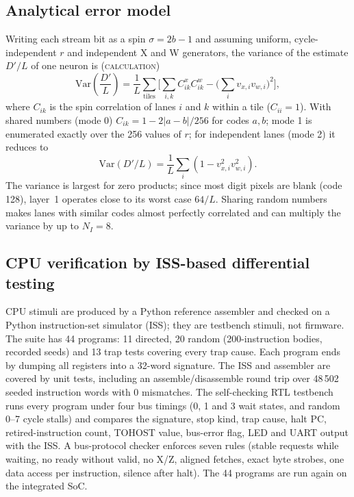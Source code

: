 \documentclass[conference]{IEEEtran}
\newcommand{\Dp}{D'}                 %
\newcommand{\IL}{N_{I}}              %
\newcommand{\lbl}[1]{\textsc{#1}}    %
\begin{document}
\subsection{Analytical error model}
Writing each stream bit as a spin $\sigma=2b-1$ and assuming uniform,
cycle-independent $r$ and independent X and W generators, the variance of the
estimate $\Dp/L$ of one neuron is (\lbl{calculation})
\begin{equation}
  \mathrm{Var}\!\left(\frac{\Dp}{L}\right) = \frac{1}{L}\sum_{\text{tiles}}
  \Big[\sum_{i,k} C^{x}_{ik} C^{w}_{ik} - \Big(\sum_i v_{x,i} v_{w,i}\Big)^2\Big],
  \label{eq:var2}
\end{equation}
where $C_{ik}$ is the spin correlation of lanes $i$ and $k$ within a tile
($C_{ii}=1$). With shared numbers (mode 0) $C_{ik}=1-2|a-b|/256$ for codes $a,b$;
mode 1 is enumerated exactly over the 256 values of $r$; for independent lanes
(mode 2) it reduces to
\begin{equation}
  \mathrm{Var}\!\left(\Dp/L\right) = \frac{1}{L}\sum_i \left(1 - v_{x,i}^2
  v_{w,i}^2\right).
  \label{eq:var3}
\end{equation}
The variance is largest for zero products; since most digit pixels are blank
(code 128), layer~1 operates close to its worst case $64/L$. Sharing random
numbers makes lanes with similar codes almost perfectly correlated and can
multiply the variance by up to $\IL=8$.

\subsection{CPU verification by ISS-based differential testing}
CPU stimuli are produced by a Python reference assembler and checked on a
Python instruction-set simulator (ISS); they are testbench stimuli, not
firmware. The suite has 44 programs: 11 directed, 20 random (200-instruction
bodies, recorded seeds) and 13 trap tests covering every trap cause. Each
program ends by dumping all registers into a 32-word signature. The ISS and
assembler are covered by unit tests, including an assemble/disassemble round
trip over 48\,502 seeded instruction words with 0 mismatches.
The self-checking RTL testbench runs every program under four bus timings
(0, 1 and 3 wait states, and random 0--7 cycle stalls) and compares the
signature, stop kind, trap cause, halt PC, retired-instruction count, TOHOST
value, bus-error flag, LED and UART output with the ISS. A bus-protocol checker
enforces seven rules (stable requests while waiting, no ready without valid,
no X/Z, aligned fetches, exact byte strobes, one data access per instruction,
silence after halt). The 44 programs are run again on the integrated SoC.
\end{document}
